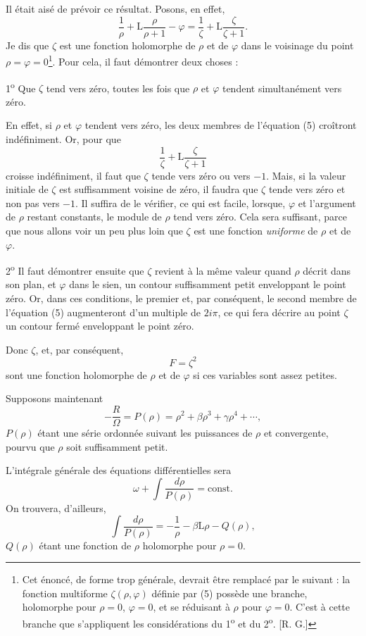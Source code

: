 \documentclass[11pt]{article}
\begin{document}
Il était aisé de prévoir ce résultat. Posons, en effet,
\begin{equation}\tag{5}
\frac1\rho+\mathrm L\frac{\rho}{\rho+1}-\varphi
=\frac1\zeta+\mathrm L\frac{\zeta}{\zeta+1}.
\end{equation}
Je dis que $\zeta$ est une fonction holomorphe de $\rho$ et de $\varphi$ dans le voisinage du point $\rho=\varphi=0$\footnote{Cet énoncé, de forme trop générale, devrait être remplacé par le suivant : la fonction multiforme $\zeta(\rho,\varphi)$ définie par (5) possède une branche, holomorphe pour $\rho=0$, $\varphi=0$, et se réduisant à $\rho$ pour $\varphi=0$. C’est à cette branche que s’appliquent les considérations du 1\textsuperscript{o} et du 2\textsuperscript{o}. [R. G.]}. Pour cela, il faut démontrer deux choses :

1\textsuperscript{o} Que $\zeta$ tend vers zéro, toutes les fois que $\rho$ et $\varphi$ tendent simultanément vers zéro.

En effet, si $\rho$ et $\varphi$ tendent vers zéro, les deux membres de l’équation (5) croîtront indéfiniment. Or, pour que
\[
\frac1\zeta+\mathrm L\frac{\zeta}{\zeta+1}
\]
croisse indéfiniment, il faut que $\zeta$ tende vers zéro ou vers $-1$. Mais, si la valeur initiale de $\zeta$ est suffisamment voisine de zéro, il faudra que $\zeta$ tende vers zéro et non pas vers $-1$. Il suffira de le vérifier, ce qui est facile, lorsque, $\varphi$ et l’argument de $\rho$ restant constants, le module de $\rho$ tend vers zéro. Cela sera suffisant, parce que nous allons voir un peu plus loin que $\zeta$ est une fonction \emph{uniforme} de $\rho$ et de $\varphi$.

2\textsuperscript{o} Il faut démontrer ensuite que $\zeta$ revient à la même valeur quand $\rho$ décrit dans son plan, et $\varphi$ dans le sien, un contour suffisamment petit enveloppant le point zéro. Or, dans ces conditions, le premier et, par conséquent, le second membre de l’équation (5) augmenteront d’un multiple de $2i\pi$, ce qui fera décrire au point $\zeta$ un contour fermé enveloppant le point zéro.

Donc $\zeta$, et, par conséquent,
\[
F=\zeta^2
\]
sont une fonction holomorphe de $\rho$ et de $\varphi$ si ces variables sont assez petites.

Supposons maintenant
\[
-\frac{R}{\Omega}=P(\rho)=\rho^2+\beta\rho^3+\gamma\rho^4+\cdots,
\]
$P(\rho)$ étant une série ordonnée suivant les puissances de $\rho$ et convergente, pourvu que $\rho$ soit suffisamment petit.

L’intégrale générale des équations différentielles sera
\[
\omega+\int\frac{d\rho}{P(\rho)}=\mathrm{const.}
\]
On trouvera, d’ailleurs,
\[
\int\frac{d\rho}{P(\rho)}=-\frac1\rho-\beta\mathrm L\rho-Q(\rho),
\]
$Q(\rho)$ étant une fonction de $\rho$ holomorphe pour $\rho=0$.
\end{document}
